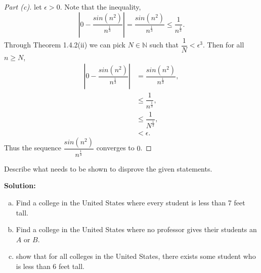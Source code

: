 \documentclass[12pt]{article}
\makeatletter
\theoremstyle{homework}
\newenvironment{exercise}[1]
{\def\@currentlabel{#1}\exercisecore}
{\endexercisecore}
\newcommand{\localhead}[1]{\par\smallskip\noindent\textbf{#1}\nobreak\\}%
\newcommand\solution{\localhead{Solution:}}
\newcommand{\Nats}{\ensuremath{\mathbb N}}
\makeatother
\begin{document}
\begin{proof}[Part (c)]let $\epsilon > 0$. Note that the inequality,
	\begin{equation*}
		|0 - \dfrac{sin(n^2)}{n^\frac{1}{3}}| = \dfrac{sin(n^2)}{n^\frac{1}{3}} \le \dfrac{1}{n^\frac{1}{3}}. 
	\end{equation*}
	Through Theorem 1.4.2(ii) we can pick $N \in \Nats$ such that $\dfrac{1}{N}<\epsilon^3$. Then for all $n \geq N$,
	\begin{align*}
		|0 - \dfrac{sin(n^2)}{n^\frac{1}{3}}| &= \dfrac{sin(n^2)}{n^\frac{1}{3}},\\
		&\le \dfrac{1}{n^\frac{1}{3}},\\
		&\le \dfrac{1}{N^\frac{1}{3}},\\
		&< \epsilon.
	\end{align*}
	Thus the sequence $\dfrac{sin(n^2)}{n^\frac{1}{3}}$ converges to $0$.  
\end{proof}











\begin{exercise}{2.2.3}
Describe what needs to be shown to disprove the given statements.
\end{exercise}
\solution
\begin{enumerate}[(a)]
\item Find a college in the United States where every student is less than 7 feet tall.
\item Find a college in the United States where no professor gives their students an $A$ or $B$.
\item show that for all colleges in the United States, there exists some student who is less than 6 feet tall.
\end{enumerate}
\end{document}
